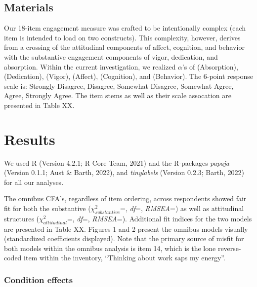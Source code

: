 \documentclass[
  man]{apa7}
\begin{document}
\hypertarget{materials}{%
\subsection{Materials}\label{materials}}

Our 18-item engagement measure was crafted to be intentionally complex (each item is intended to load on two constructs). This complexity, however, derives from a crossing of the attitudinal components of affect, cognition, and behavior with the substantive engagement components of vigor, dedication, and absorption. Within the current investigation, we realized \(\alpha\)'s of (Absorption), (Dedication), (Vigor), (Affect), (Cognition), and (Behavior). The 6-point response scale is: Strongly Disagree, Disagree, Somewhat Disagree, Somewhat Agree, Agree, Strongly Agree. The item stems as well as their scale assocation are presented in Table XX.

\hypertarget{results}{%
\section{Results}\label{results}}

We used R (Version 4.2.1; R Core Team, 2021) and the R-packages \emph{papaja} (Version 0.1.1; Aust \& Barth, 2022), and \emph{tinylabels} (Version 0.2.3; Barth, 2022) for all our analyses.

The omnibus CFA's, regardless of item ordering, across respondents showed fair fit for both the substantive (\(\chi^2_{substantive}\)=, \emph{df}=, \emph{RMSEA}=) as well as attitudinal structures (\(\chi^2_{attitudinal}\)=, \emph{df}=, \emph{RMSEA}=). Additional fit indices for the two models are presented in Table XX. Figures 1 and 2 present the omnibus models visually (standardized coefficients displayed). Note that the primary source of misfit for both models within the omnibus analysis is item 14, which is the lone reverse-coded item within the inventory, ``Thinking about work saps my energy''.

\hypertarget{condition-effects}{%
\subsubsection{Condition effects}\label{condition-effects}}
\end{document}

